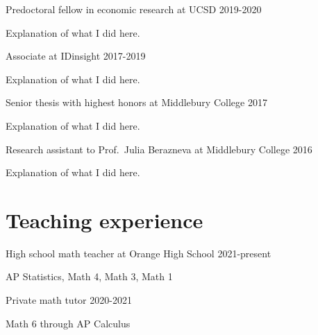 \documentclass[11pt,]{article}
\providecommand{\tightlist}{%
  \setlength{\itemsep}{0pt}\setlength{\parskip}{0pt}}
\renewenvironment{itemize}{
  \begin{list}{}{
    \setlength{\leftmargin}{1.5em}
  }
}{
  \end{list}
}
\begin{document}
\begin{itemize}
\item
  Predoctoral fellow in economic research at UCSD \hfill 2019-2020

  \begin{itemize}
  \tightlist
  \item
    Explanation of what I did here.
  \end{itemize}
\item
  Associate at IDinsight \hfill 2017-2019

  \begin{itemize}
  \tightlist
  \item
    Explanation of what I did here.
  \end{itemize}
\item
  Senior thesis with highest honors at Middlebury College \hfill 2017

  \begin{itemize}
  \tightlist
  \item
    Explanation of what I did here.
  \end{itemize}
\item
  Research assistant to Prof.~Julia Berazneva at Middlebury College
  \hfill 2016

  \begin{itemize}
  \tightlist
  \item
    Explanation of what I did here.
  \end{itemize}
\end{itemize}

\hypertarget{teaching-experience}{%
\section{Teaching experience}\label{teaching-experience}}

\begin{itemize}
\item
  High school math teacher at Orange High School \hfill 2021-present

  \begin{itemize}
  \tightlist
  \item
    AP Statistics, Math 4, Math 3, Math 1
  \end{itemize}
\item
  Private math tutor \hfill 2020-2021

  \begin{itemize}
  \tightlist
  \item
    Math 6 through AP Calculus
  \end{itemize}
\end{itemize}
\end{document}
